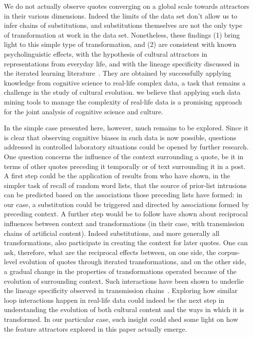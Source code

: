 \begin{new}
We do not actually observe quotes converging on a global scale towards attractors in their various dimensions.
Indeed the limits of the data set don't allow us to infer chains of substitutions, and substitutions themselves are not the only type of transformation at work in the data set.
Nonetheless, these findings (1) bring light to this simple type of transformation, and (2) are consistent with known psycholinguistic effects, with the hypothesis of cultural attractors in representations from everyday life, and with the lineage specificity discussed in the iterated learning literature~\citep{claidiere_cultural_2014,cornish_systems_2013}.
They are obtained by successfully applying knowledge from cognitive science to real-life complex data, a task that remains a challenge in the study of cultural evolution.
 we believe that applying such data mining tools to manage the complexity of real-life data is a promising approach for the joint analysis of cognitive science and culture.

In the simple case presented here, however, much remains to be explored.
Since it is clear that observing cognitive biases in such data is now possible, questions addressed in controlled laboratory situations could be opened by further research.
One question concerns the influence of the context surrounding a quote, be it in terms of other quotes preceding it temporally or of text surrounding it in a post.
A first step could be the application of results from \citet{zaromb_temporal_2006} who have shown, in the simpler task of recall of random word lists, that the source of prior-list intrusions can be predicted based on the associations those preceding lists have formed:
in our case, a substitution could be triggered and directed by associations formed by preceding context.
A further step would be to follow \citet{cornish_systems_2013} have shown about reciprocal influences between context and transformations (in their case, with transmission chains of artificial content).
Indeed substitutions, and more generally all transformations, also participate in creating the context for later quotes.
One can ask, therefore, what are the reciprocal effects between, on one side, the corpus-level evolution of quotes through iterated transformations, and on the other side, a gradual change in the properties of transformations operated because of the evolution of surrounding context.
Such interactions have been shown to underlie the lineage specificity observed in transmission chains~\citep{claidiere_cultural_2014}.
Exploring how similar loop interactions happen in real-life data could indeed be the next step in understanding the evolution of both cultural content and the ways in which it is transformed.
In our particular case, such insight could shed some light on how the feature attractors explored in this paper actually emerge.

\end{new}


